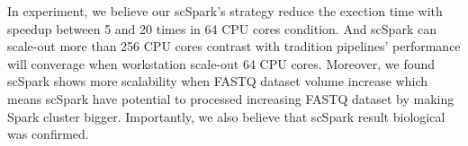 \documentclass[conference]{IEEEtran}
\begin{document}
In experiment, we believe our scSpark's strategy reduce the exection time with speedup between 5 and 20 times in 64 CPU cores condition.
And scSpark can scale-out more than 256 CPU cores contrast with tradition pipelines' performance will converage when workstation scale-out 64 CPU cores.
Moreover, we found scSpark shows more scalability when FASTQ dataset volume increase which means scSpark have potential to processed increasing FASTQ dataset by making Spark cluster bigger.
Importantly, we also believe that scSpark result biological was confirmed.



\end{document}
